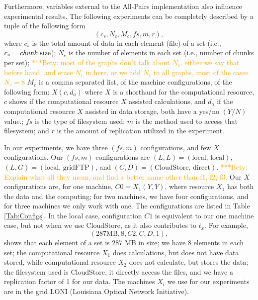 \documentclass{rspublic}
\newcommand{\betynote}[1]{ {\textcolor{orange} { ***Bety: #1 }}}
\begin{document}
Furthermore, variables external to the All-Pairs implementation also
influence experimental results. The following experiments can be
completely described by a tuple of the following form
 \begin{equation}
(c_s, N_c, M_c, fs, m,r),
\label{Eq:tuple}
\end{equation}
where $c_s$ is the total amount of data in each element (file) of a set (i.e., $c_s=\mbox{\textit{chunk} size}$); 
$N_c$ is the number of elements in each set (i.e., number of chunks per set); \betynote{most of the graphs don't talk about $N_c$, either we say that before hand, and erase $N_c$ in here, or we add $N_c$ to all graphs, most of the cases  $N_c= 8$}
$M_c$ is a comma separated list, of the machine configurations, of the following
form: $X(c, d_a)$ where $X$ is a shorthand for the computational resource,  $c$ shows if the computational resource $X$ assisted calculations, and $d_a$ if
the computational resource $X$ assisted in data storage, both have a yes/no $(Y/N)$ value.; 
$fs$ is the type of filesystem used;
$m$ is the method used to access that filesystem; and
$r$ is the amount of replication utilized in the experiment. 

In our experiments, we have three $(fs, m)$ configurations, and few $X$ configurations. Our $(fs, m)$ configurations are $(L,L)=(\mbox{local, local})$, $(L,G)=(\mbox{local, gridFTP})$, and $(C,D)=(\mbox{CloudStore, direct})$.\betynote{Explain what all they mean, and find a better name other than f1, f2, f3.} Our $X$ configurations are, for one machine, $C0=X_1(Y,Y)$, where resource $X_1$ has both the data and the computing; for two machines, we have four configurations, and for three machines we only work with one. The configurations are listed in Table \ref{Tab:Configs}. In the local case, configuration $C1$ is equivalent to our one machine case, but not when we use CloudStore, as it also contributes to $t_x$. For example, 
 \begin{equation}
(287 \mbox{MB}, 8, C2, C, D, 1),
\end{equation}
shows that each element of a set is 287 MB in size; we have 8 elements
in each set; the computational resource $X_1$ does calculations, but does
not have data stored, while computational resource $X_2$ does not
calculate, but stores the data; the filesystem used is CloudStore, it
directly access the files, and we have a replication factor of 1 for our
data. The machines $X_i$ we use for our experiments are in the grid LONI (Louisiana Optical Network Initiative).
\end{document}
